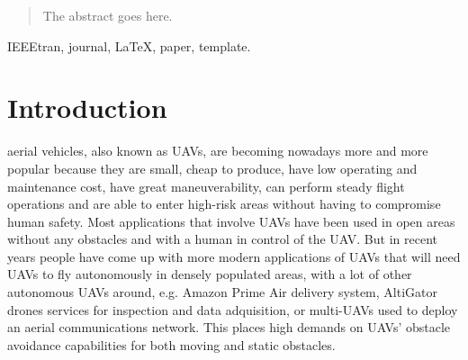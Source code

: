 \documentclass[journal]{IEEEtran}
\begin{document}
	\begin{abstract}
		The abstract goes here.
	\end{abstract}
	
	\begin{IEEEkeywords}
		IEEEtran, journal, \LaTeX, paper, template.
	\end{IEEEkeywords}
	
	
	
	\section{Introduction}
	 aerial vehicles, also known as UAVs, are becoming nowadays more and more popular because they are small, cheap to produce, have low operating and maintenance cost, have great maneuverability, can perform steady flight operations and are able to enter high-risk areas without having to compromise human safety. Most applications that involve UAVs have been used in open areas without any obstacles and with a human in control of the UAV. But in recent years people have come up with more modern applications of UAVs that will need UAVs to fly autonomously in densely populated areas, with a lot of other autonomous UAVs around, e.g. Amazon Prime Air delivery system, AltiGator drones services for inspection and data adquisition, or multi-UAVs used to deploy an aerial communications network. This places high demands on UAVs’ obstacle avoidance capabilities for both moving and static obstacles.
	
\end{document}

